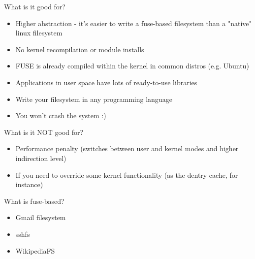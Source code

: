 \documentclass{beamer}
\begin{document}
\begin{frame}{What is it good for?}

	\begin{itemize}[<+->]

		\item{Higher abstraction - it's easier to write a fuse-based filesystem than a "native" linux filesystem}

		\item{No kernel recompilation or module installs}
		
		\item{FUSE is already compiled within the kernel in common distros (e.g. Ubuntu)}
	
		\item{Applications in user space have lots of ready-to-use libraries}

		\item{Write your filesystem in any programming language}
		
		\item{You won't crash the system :)}
	
	\end{itemize}

\end{frame}

\begin{frame}{What is it NOT good for?}

	\begin{itemize}[<+->]

		\item{Performance penalty (switches between user and kernel modes and higher indirection level)}

		\item{If you need to override some kernel functionality (as the dentry cache, for instance)}
	
	\end{itemize}

\end{frame}

\begin{frame}{What is fuse-based?}

	\begin{itemize}[<+->]

		\item{Gmail filesystem}\footnotemark[1]
		
		\item{sshfs}\footnotemark[2]
		
		\item{WikipediaFS}\footnotemark[3]
	
	\end{itemize}
	


	
\end{frame}
\end{document}
